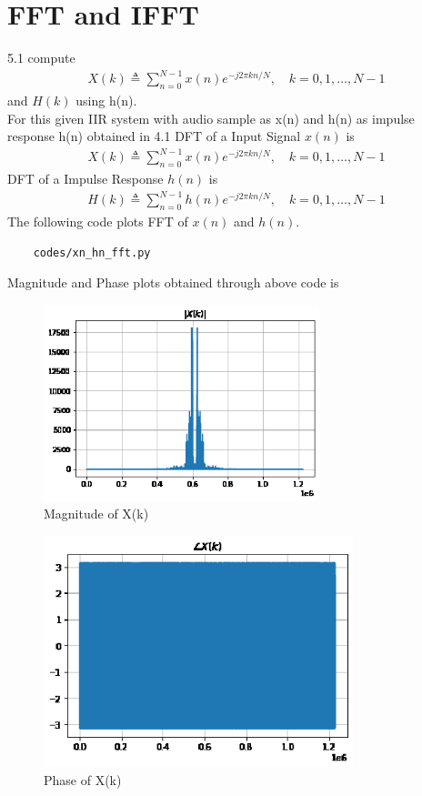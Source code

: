 \documentclass[journal,12pt,twocolumn]{IEEEtran}
\begin{document}
\section{FFT and IFFT}
5.1 compute
\begin{align}
        X(k) \triangleq \sum_{n=0}^{N-1} x(n) e^{-j 2 \pi k n / N}, \quad k=0,1, \ldots, N-1
\end{align}
and $H(k)$ using h(n).
\\
\solution
For this given IIR system with audio sample as x(n) and h(n) as impulse response h(n) obtained in 4.1 
DFT of a Input Signal $x(n)$ is 
\begin{align}
    X(k) \triangleq \sum_{n=0}^{N-1} x(n) e^{-j 2 \pi k n / N}, \quad k=0,1, \ldots, N-1
\end{align}
DFT of a Impulse Response $h(n)$ is 
\begin{align}
    H(k) \triangleq \sum_{n=0}^{N-1} h(n) e^{-j 2 \pi k n / N}, \quad k=0,1, \ldots, N-1
\end{align}
The following code plots FFT of $x(n)$ and $h(n)$.
\begin{lstlisting}
    codes/xn_hn_fft.py
\end{lstlisting}
Magnitude and Phase plots obtained through above code is\\ 
\begin{figure}[!ht]
\centering
\includegraphics[width=8cm]{./figs/abs_xk.eps}
\caption{Magnitude of X(k)}
\label{fig:xfft}
\end{figure}
\begin{figure}[!ht]
\centering
\includegraphics[width=9cm]{./figs/phase_xk.eps}
\caption{Phase of X(k)}
\label{fig:xfft}
\end{figure}
\end{document}
